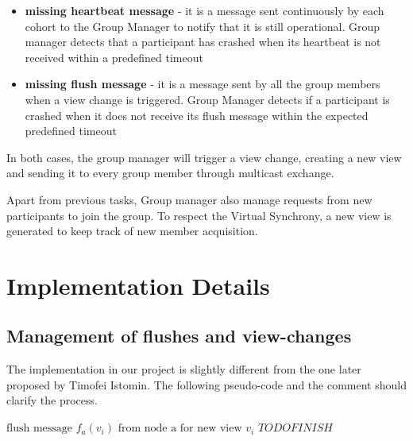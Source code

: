 \documentclass[11pt]{article}
\begin{document}
	\begin{itemize}
		\item \textbf{missing heartbeat message} - it is a message sent continuously by each cohort to the Group Manager to notify that it is still operational. Group manager detects that a participant has crashed when its heartbeat is not received within a predefined timeout
		\item \textbf{missing flush message} - it is a message sent by all the group members when a view change is triggered. Group Manager detects if a participant is crashed when it does not receive its flush message within the expected predefined timeout
	\end{itemize}
	In both cases, the group manager will trigger a view change, creating a new view and sending it to every group member through multicast exchange.
	
	Apart from previous tasks, Group manager also manage requests from new participants to join the group. To respect the Virtual Synchrony, a new view is generated to keep track of new member acquisition.
	
	
	\section{Implementation Details}
	\label{sec:imp_details}
	\subsection{Management of flushes and view-changes}
	The implementation in our project is slightly different from the one later proposed by Timofei Istomin. The following pseudo-code and the comment should clarify the process.
	
	\begin{algorithm}
		\begin{algorithmic}
		\REQUIRE $\text{flush message }f_{a}(v_{i}) \text{ from node a for new view } v_{i} $
		\STATE $ TODO FINISH$
		\end{algorithmic}		
	\end{algorithm}
	
\end{document}
